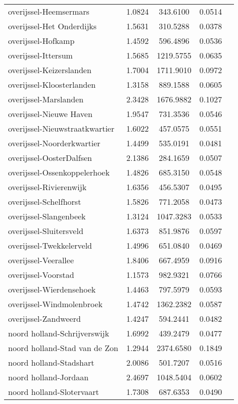 \begin{longtable}{llccc}
overijssel-Heemsermars & 1.0824 & 343.6100 & 0.0514 \\
overijssel-Het Onderdijks & 1.5631 & 310.5288 & 0.0378 \\
overijssel-Hofkamp & 1.4592 & 596.4896 & 0.0536 \\
overijssel-Ittersum & 1.5685 & 1219.5755 & 0.0635 \\
overijssel-Keizerslanden & 1.7004 & 1711.9010 & 0.0972 \\
overijssel-Kloosterlanden & 1.3158 & 889.1588 & 0.0605 \\
overijssel-Marslanden & 2.3428 & 1676.9882 & 0.1027 \\
overijssel-Nieuwe Haven & 1.9547 & 731.3536 & 0.0546 \\
overijssel-Nieuwstraatkwartier & 1.6022 & 457.0575 & 0.0551 \\
overijssel-Noorderkwartier & 1.4499 & 535.0191 & 0.0481 \\
overijssel-OosterDalfsen & 2.1386 & 284.1659 & 0.0507 \\
overijssel-Ossenkoppelerhoek & 1.4826 & 685.3150 & 0.0548 \\
overijssel-Rivierenwijk & 1.6356 & 456.5307 & 0.0495 \\
overijssel-Schelfhorst & 1.5826 & 771.2058 & 0.0473 \\
overijssel-Slangenbeek & 1.3124 & 1047.3283 & 0.0533 \\
overijssel-Sluitersveld & 1.6373 & 851.9876 & 0.0597 \\
overijssel-Twekkelerveld & 1.4996 & 651.0840 & 0.0469 \\
overijssel-Veerallee & 1.8406 & 667.4959 & 0.0916 \\
overijssel-Voorstad & 1.1573 & 982.9321 & 0.0766 \\
overijssel-Wierdensehoek & 1.4463 & 797.5979 & 0.0593 \\
overijssel-Windmolenbroek & 1.4742 & 1362.2382 & 0.0587 \\
overijssel-Zandweerd & 1.4247 & 594.2441 & 0.0482 \\
noord holland-Schrijverswijk & 1.6992 & 439.2479 & 0.0477 \\
noord holland-Stad van de Zon & 1.2944 & 2374.6580 & 0.1849 \\
noord holland-Stadshart & 2.0086 & 501.7207 & 0.0516 \\
noord holland-Jordaan & 2.4697 & 1048.5404 & 0.0602 \\
noord holland-Slotervaart & 1.7308 & 687.6353 & 0.0490 \\

\end{longtable}
